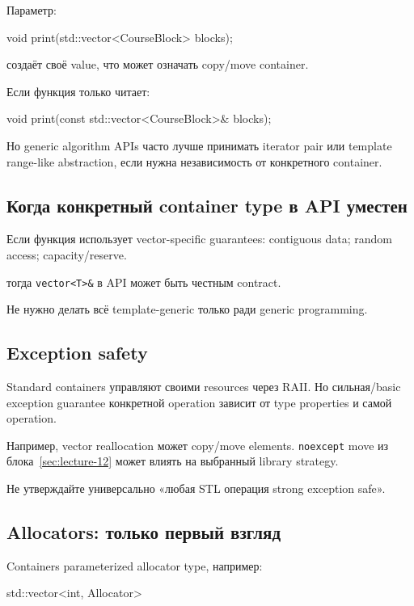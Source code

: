 Параметр:

\begin{cppcode}
void print(std::vector<CourseBlock> blocks);
\end{cppcode}

создаёт своё value, что может означать copy/move container.

Если функция только читает:

\begin{cppcode}
void print(const std::vector<CourseBlock>& blocks);
\end{cppcode}

Но generic algorithm APIs часто лучше принимать iterator pair или template
range-like abstraction, если нужна независимость от конкретного container.

\subsection{Когда конкретный container type в API уместен}

Если функция использует vector-specific guarantees:
contiguous data; random access; capacity/reserve.

тогда \texttt{vector<T>\&} в API может быть честным contract.

Не нужно делать всё template-generic только ради generic programming.

\subsection{Exception safety}

Standard containers управляют своими resources через RAII. Но сильная/basic
exception guarantee конкретной operation зависит от type properties и самой
operation.

Например, vector reallocation может copy/move elements. \texttt{noexcept} move
из блока~\ref{sec:lecture-12} может влиять на выбранный library strategy.

Не утверждайте универсально «любая STL операция strong exception safe».

\subsection{Allocators: только первый взгляд}

Containers parameterized allocator type, например:

\begin{cppcode}
std::vector<int, Allocator>
\end{cppcode}

